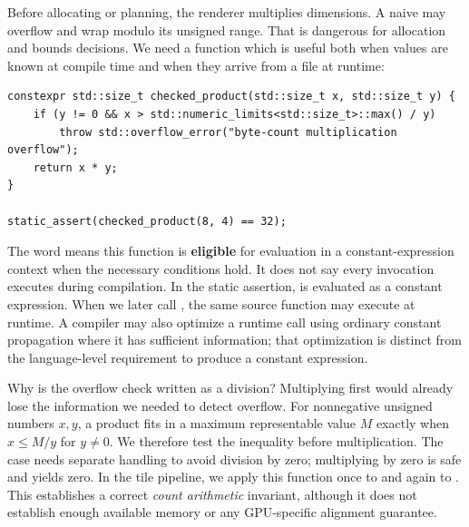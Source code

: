 \hypertarget{01-foundations-i-ch005-some-calculations-can-be-used-at-compile-time-without-being-forced-there}{}

Before allocating or planning, the renderer multiplies dimensions. A naive  may overflow  and wrap modulo its unsigned range. That is dangerous for allocation and bounds decisions. We need a function which is useful both when values are known at compile time and when they arrive from a file at runtime:

\begin{verbatim}
constexpr std::size_t checked_product(std::size_t x, std::size_t y) {
    if (y != 0 && x > std::numeric_limits<std::size_t>::max() / y)
        throw std::overflow_error("byte-count multiplication overflow");
    return x * y;
}

static_assert(checked_product(8, 4) == 32);
\end{verbatim}

The word  means this function is \textbf{eligible} for evaluation in a constant-expression context when the necessary conditions hold. It does not say every invocation executes during compilation. In the static assertion,  is evaluated as a constant expression. When we later call , the same source function may execute at runtime. A compiler may also optimize a runtime call using ordinary constant propagation where it has sufficient information; that optimization is distinct from the language-level requirement to produce a constant expression.

Why is the overflow check written as a division? Multiplying first would already lose the information we needed to detect overflow. For nonnegative unsigned numbers \(x,y\), a product fits in a maximum representable value \(M\) exactly when \(x\le M/y\) for \(y\ne0\). We therefore test the inequality before multiplication. The  case needs separate handling to avoid division by zero; multiplying by zero is safe and yields zero. In the tile pipeline, we apply this function once to  and again to . This establishes a correct \emph{count arithmetic} invariant, although it does not establish enough available memory or any GPU-specific alignment guarantee.

